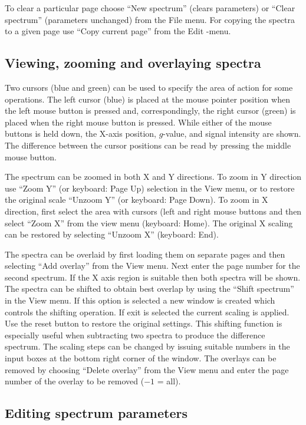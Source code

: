 \documentclass[byrevtex,amssymb,aps,pra,floatfix,letterpaper]{revtex4}
\begin{document}
To clear a particular page choose ``New spectrum'' (clears parameters) or ``Clear spectrum'' (parameters unchanged) from the File menu. For copying the spectra to a given page use ``Copy current page'' from the Edit -menu.

\subsection{Viewing, zooming and overlaying spectra}

Two cursors (blue and green) can be used to specify the area of action for some operations. The left cursor (blue) is placed at the mouse pointer position when the left mouse button is pressed and, correspondingly, the right cursor (green) is placed when the right mouse button is pressed. While either of the mouse buttons is held down, the X-axis position, $g$-value, and signal intensity are shown. The difference between the cursor positions can be read by pressing the middle mouse button. 

The spectrum can be zoomed in both X and Y directions. To zoom in Y direction use ``Zoom Y'' (or keyboard: Page Up) selection in the View menu, or to restore the original scale ``Unzoom Y'' (or keyboard: Page Down). To zoom in X direction, first select the area with cursors (left and right mouse buttons and then select ``Zoom X'' from the view menu (keyboard: Home). The original X scaling can be restored by selecting ``Unzoom X'' (keyboard: End).

The spectra can be overlaid by first loading them on separate pages and then selecting ``Add overlay'' from the View menu. Next enter the page number for the second spectrum. If the X axis region is suitable then both spectra will be shown. The spectra can be shifted to obtain best overlap by using the ``Shift spectrum'' in the View menu. If this option is selected a new window is created which controls the shifting operation. If exit is selected the current scaling is applied. Use the reset button to restore the original settings. This shifting function is especially useful when subtracting two spectra to produce the difference spectrum. The scaling steps can be changed by issuing suitable numbers in the input boxes at the bottom right corner of the window. The overlays can be removed by choosing ``Delete overlay'' from the View menu and enter the page number of the overlay to be removed ($-1$ = all).

\subsection{Editing spectrum parameters}
\end{document}
